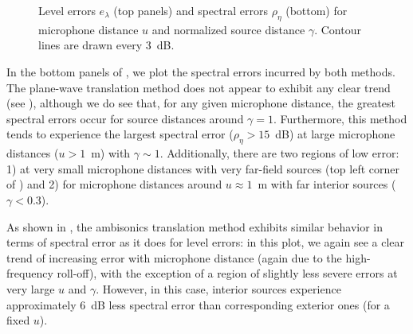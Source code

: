 \begin{figure}[tbp]
    	\caption[Level and coloration contour plots for each extrapolation method.]{
	Level errors $e_\lambda$ (top panels) and spectral errors $\rho_\eta$ (bottom) for microphone distance $u$ and normalized source distance $\gamma$.
  Contour lines are drawn every $3$~dB.}
    	\label{fig:07_Characterization_Extrapolation:Level_Spectral_Errors}
\end{figure}


In the bottom panels of , we plot the spectral errors incurred by both methods.
The plane-wave translation method does not appear to exhibit any clear trend (see ), although we do see that, for any given microphone distance, the greatest spectral errors occur for source distances around $\gamma = 1$.
Furthermore, this method tends to experience the largest spectral error ($\rho_\eta > 15$~dB) at large microphone distances ($u > 1$~m) with $\gamma \sim 1$.
Additionally, there are two regions of low error: 1) at very small microphone distances with very far-field sources (top left corner of ) and 2) for microphone distances around $u \approx 1$~m with far interior sources ($\gamma < 0.3$).

As shown in , the ambisonics translation method exhibits similar behavior in terms of spectral error as it does for level errors:
in this plot, we again see a clear trend of increasing error with microphone distance (again due to the high-frequency roll-off), with the exception of a region of slightly less severe errors at very large $u$ and $\gamma$.
However, in this case, interior sources experience approximately $6$~dB less spectral error than corresponding exterior ones (for a fixed $u$).


